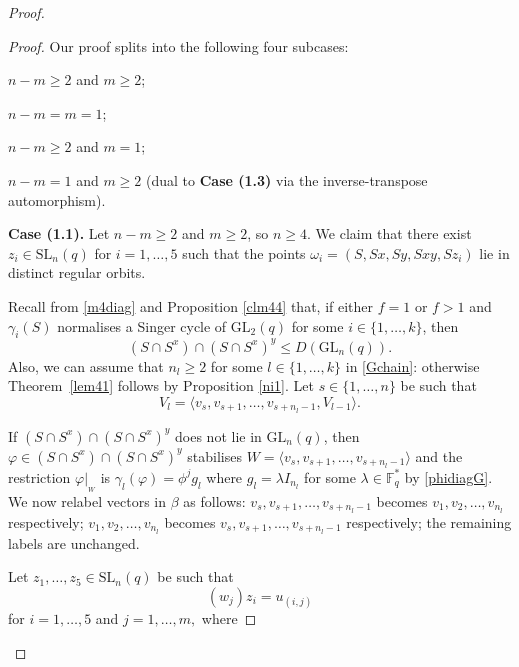 \documentclass[a4paper,reqno,11pt]{amsart}
\theoremstyle{definition}
\theoremstyle{remark}
\numberwithin{equation}{section}
\newcommand{\SL}{{\mathrm{SL}}}
\newcommand{\GL}{{\mathrm{GL}}}
\begin{document}
\begin{proof}
\begin{proof}
  Our proof splits into the following four  subcases:
\begin{description}[before={\renewcommand\makelabel[1]{\bfseries ##1}}]
\item[{\bf Case (1.1)}] $n-m\ge 2 $ and $m \ge 2$;
\item[{\bf Case (1.2)}] $n-m=m=1$;
\item[{\bf Case (1.3)}] $n-m \ge 2$ and $m=1$;
\item[{\bf Case (1.4)}] $n-m=1$  and $m \ge 2$ (dual to {\bf Case (1.3)} via the inverse-transpose automorphism).
\end{description} 



{\bf Case (1.1).} Let $n-m\ge 2 $ and $m \ge 2$, so $n \ge 4$. We claim that there exist $z_i \in \SL_n(q)$ for $i=1, \ldots, 5$ such that the points $\omega_i=(S,Sx,Sy,Sxy,Sz_i)$ lie in distinct regular orbits. 

 Recall from \eqref{m4diag} and Proposition \ref{clm44} that, if either $f=1$ or  $f>1$ and  $\gamma_i(S)$ normalises a Singer cycle of $\GL_2(q)$ for some $i \in \{1, \ldots, k\}$, then $$(S \cap S^x) \cap (S \cap S^x)^y \le D(\GL_n(q)).$$ Also, we can assume that $n_l \ge 2$ for some $l \in \{1, \ldots, k\}$ in \eqref{Gchain}: otherwise Theorem~\ref{lem41} follows by Proposition \ref{ni1}. Let $s \in \{1, \ldots, n\}$ be such that $$V_l = \langle v_s, v_{s+1}, \ldots, v_{s+n_l-1}, V_{l-1} \rangle.$$

 If $(S \cap S^x) \cap (S \cap S^x)^y$ does not lie in $\GL_n(q)$, then   $\varphi \in (S \cap S^x) \cap (S \cap S^x)^y$ stabilises $W=\langle v_s, v_{s+1}, \ldots, v_{s+n_l-1} \rangle$ and the restriction $\varphi|_{_{W}}$ is $\gamma_l(\varphi)=\phi^j g_l$ where $g_l =\lambda I_{n_l}$ for some $\lambda \in \mathbb{F}_q^*$ by \eqref{phidiagG}. We now relabel vectors in $\beta$ as follows: $v_s, v_{s+1}, \ldots, v_{s+n_l-1}$ becomes $v_1, v_{2}, \ldots, v_{n_l}$ respectively; $v_1, v_{2}, \ldots, v_{n_l}$  becomes $v_s, v_{s+1}, \ldots, v_{s+n_l-1}$  respectively;  the remaining labels are unchanged.



  Let $z_1, \ldots, z_5 \in \SL_n(q)$ be such that $$(w_{j})z_i=u_{(i,j)}$$ for $i=1, \ldots, 5$ and $j=1, \ldots, m,$ where


\end{proof}
\end{proof}
\end{document}

